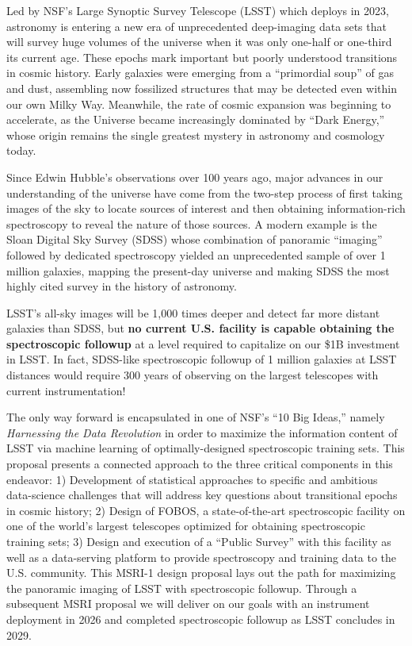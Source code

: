 \documentclass[oneside,11pt]{amsart}
\begin{document}
Led by NSF's Large Synoptic Survey Telescope (LSST) which deploys in 2023, astronomy is entering a new era of
unprecedented deep-imaging data sets that will survey huge volumes of the universe when it was only one-half or
one-third its current age.  These epochs mark important but poorly understood transitions in cosmic history. Early
galaxies were emerging from a ``primordial soup'' of gas and dust, assembling now fossilized structures that may be
detected even within our own Milky Way.  Meanwhile, the rate of cosmic expansion was beginning to accelerate, as the
Universe became increasingly dominated by ``Dark Energy,'' whose origin remains the single greatest mystery in
astronomy and cosmology today.

Since Edwin Hubble's observations over 100 years ago, major advances in our understanding of the universe have come
from the two-step process of first taking images of the sky to locate sources of interest and then obtaining
information-rich spectroscopy to reveal the nature of those sources.  A modern example is the Sloan Digital Sky Survey
(SDSS) whose combination of panoramic ``imaging'' followed by dedicated spectroscopy yielded an unprecedented sample of
over 1 million galaxies, mapping the present-day universe and making SDSS the most highly cited survey in the history
of astronomy.


LSST's all-sky images will be 1,000 times deeper and detect far more distant galaxies than SDSS, but {\bf no current
U.S. facility is capable obtaining the spectroscopic followup} at a level required to capitalize on our \$1B investment
in LSST.  In fact, SDSS-like spectroscopic followup of 1 million galaxies at LSST distances would require 300 years of
observing on the largest telescopes with current instrumentation!

The only way forward is encapsulated in one of NSF's ``10 Big Ideas,'' namely \emph{Harnessing the Data Revolution} in
order to maximize the information content of LSST via machine learning of optimally-designed spectroscopic training
sets.  This proposal presents a connected approach to the three critical components in this endeavor: 1) Development of
statistical approaches to specific and ambitious data-science challenges that will address key questions about
transitional epochs in cosmic history; 2) Design of FOBOS, a state-of-the-art spectroscopic facility on one of the
world's largest telescopes optimized for obtaining spectroscopic training sets; 3) Design and execution
of a ``Public Survey'' with this facility as well as a data-serving platform to provide spectroscopy and training data
to the U.S. community.  This MSRI-1 design proposal lays out the path for maximizing the panoramic imaging of LSST with
spectroscopic followup.  Through a subsequent MSRI proposal we will deliver on our goals with an instrument deployment
in 2026 and completed spectroscopic followup as LSST concludes in 2029.
\end{document}
